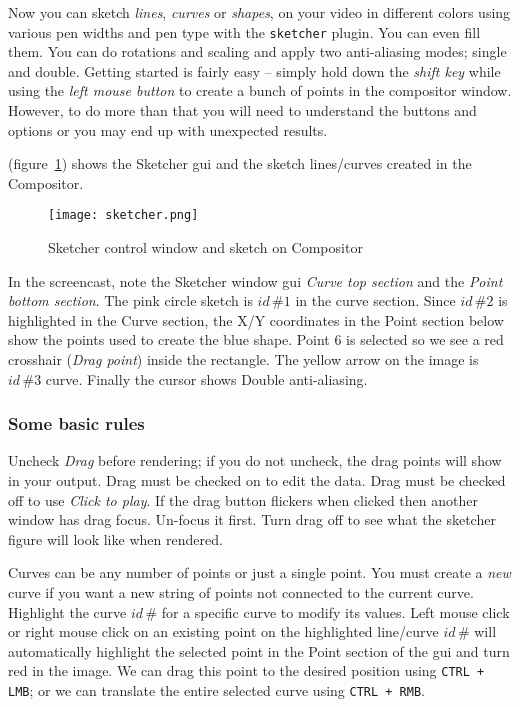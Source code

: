Now you can sketch \textit{lines}, \textit{curves} or \textit{shapes}, on your video in different colors using various pen widths and pen type with the \texttt{sketcher} plugin. You can even fill them. You can do rotations and scaling and apply two anti-aliasing modes; single and double. Getting started is fairly easy -- simply hold down the \textit{shift key} while using the \textit{left mouse button} to create a bunch of points in the compositor window. However, to do more than that you will need to understand the buttons and options or you may end up with unexpected results.

(figure~\ref{fig:sketcher}) shows the Sketcher gui and the sketch lines/curves created in the Compositor.

\begin{figure}[hbtp]
    \centering
    \texttt{[image: sketcher.png]}
    \caption{Sketcher control window and sketch on Compositor}
    \label{fig:sketcher}
\end{figure}

In the screencast, note the Sketcher window gui \textit{Curve top section} and the \textit{Point bottom section}. The pink circle sketch is $id\,\#1$ in the curve section. Since $id\,\#2$ is highlighted in the Curve section, the X/Y coordinates in the Point section below show the points used to create the blue shape. Point 6 is selected so we see a red crosshair (\textit{Drag point}) inside the rectangle. The yellow arrow on the image is $id\,\#3$ curve. Finally the cursor shows Double anti-aliasing.

\subsubsection*{Some basic rules}%
\label{ssub:some_basic_rules}

Uncheck \textit{Drag} before rendering; if you do not uncheck, the drag points will show in your output.
Drag must be checked on to edit the data. Drag must be checked off to use \textit{Click to play}.
If the drag button flickers when clicked then another window has drag focus. Un-focus it first.
Turn drag off to see what the sketcher figure will look like when rendered.

Curves can be any number of points or just a single point.  You must
create a \textit{new} curve if you want a new string of points not
connected to the current curve.  Highlight the curve $id\,\#$ for a
specific curve to modify its values.
%
Left mouse click or right mouse click on an existing point on the
highlighted line/curve $id\,\#$ will automatically highlight the
selected point in the Point section of the gui and turn red in the
image. We can drag this point to the desired position using
\texttt{CTRL + LMB}; or we can translate the entire selected curve
using \texttt{CTRL + RMB}.

